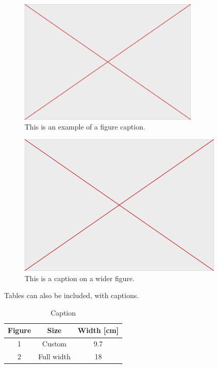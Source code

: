 \documentclass[breakmath, anonymous]{geomorphica}
\begin{document}
\begin{figure}[ht!]
	\includegraphics[width=8.6cm]{empty} 
	\caption{This is an example of a figure caption.}
	\label{fig:1}
\end{figure}
	
\begin{figure}[ht!]
	\centering
	\includegraphics[width=\textwidth]{empty} 
	\caption{This is a caption on a wider figure.}
	\label{fig:2}
\end{figure}
		
Tables can also be included, with captions.
\begin{table}[ht!]
    \caption{Caption}
	\begin{tabular}{ccc}
		Figure    & Size & Width [cm]  \\
		\hline
		1 & Custom &  9.7 \\
		2 & Full width &  18 \\
	\end{tabular}
	\label{tab:1}
\end{table}
\end{document}
